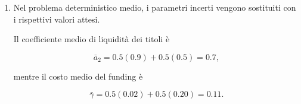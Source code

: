 \begin{enumerate}
\[
\Pi_1^{WS}(x_2)
=
0.10+0.04x_2,
\qquad
0\leq x_2\leq10.
\]

Il valore ottimo nello scenario $1$ \`e

\[
z_1^{WS}
=
\max_{0\leq x_2\leq10}
\Pi_1^{WS}(x_2).
\]

Poich\'e $\Pi_1^{WS}(x_2)$
\`e crescente,

\[
x_2^{WS,1}=10,
\qquad
x_1^{WS,1}=0,
\]

e quindi

\[
z_1^{WS}
=
\Pi_1^{WS}(10)
=
0.50.
\]

Nello scenario $2$, la funzione obiettivo
scenario-specifica \`e invece

\[
\Pi_2^{WS}(x_2)
=
0.10+0.04x_2
-
0.20\max\{0,\;0.5x_2-2\}.
\]

Esplicitando i due tratti,

\[
\Pi_2^{WS}(x_2)
=
\begin{cases}
0.10+0.04x_2,
&
0\leq x_2\leq4,
\\[4pt]
0.50-0.06x_2,
&
4\leq x_2\leq10.
\end{cases}
\]

Il valore ottimo nello scenario $2$ \`e

\[
z_2^{WS}
=
\max_{0\leq x_2\leq10}
\Pi_2^{WS}(x_2).
\]

La funzione cresce fino a $x_2=4$
e successivamente diminuisce.
Pertanto,

\[
x_2^{WS,2}=4,
\qquad
x_1^{WS,2}=6,
\]

e

\[
z_2^{WS}
=
\Pi_2^{WS}(4)
=
0.26.
\]

Il valore wait-and-see \`e il valore atteso
dei due valori ottimi scenario-specifici:

\[
\begin{aligned}
z^{WS}
&=
0.5z_1^{WS}
+
0.5z_2^{WS}
\\
&=
0.5(0.50)+0.5(0.26)
\\
&=
\boxed{0.38}.
\end{aligned}
\]

\item Nel problema deterministico medio,
i parametri incerti vengono sostituiti
con i rispettivi valori attesi.

Il coefficiente medio di liquidit\`a
dei titoli \`e

\[
\bar a_2
=
0.5(0.9)+0.5(0.5)
=
0.7,
\]

mentre il costo medio del funding \`e

\[
\bar\gamma
=
0.5(0.02)+0.5(0.20)
=
0.11.
\]


\end{enumerate}
